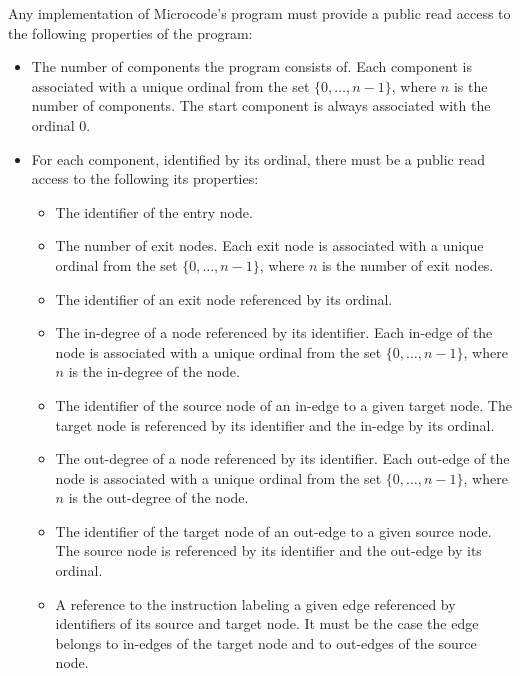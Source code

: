 \documentclass[10pt,twocolumn]{article}
\begin{document}
Any implementation of Microcode's program must provide a public read access to
the following properties of the program:
\begin{itemize}
\item The number of components the program consists of. Each component is
associated with a unique ordinal from the set $ \{ 0, \ldots, n-1 \} $, where $
n $ is the number of components. The start component is always associated with
the ordinal 0.

\item For each component, identified by its ordinal, there must be a public read
access to the following its properties:
\begin{itemize}
\item The identifier of the entry node.

\item The number of exit nodes. Each exit node is associated with a unique
ordinal from the set $ \{ 0, \ldots, n-1 \} $, where $ n $ is the number of exit
nodes.

\item The identifier of an exit node referenced by its ordinal.

\item The in-degree of a node referenced by its identifier. Each in-edge of the
node is associated with a unique ordinal from the set $ \{ 0, \ldots, n-1 \} $,
where $ n $ is the in-degree of the node.

\item The identifier of the source node of an in-edge to a given target node.
The target node is referenced by its identifier and the in-edge by its ordinal.

\item The out-degree of a node referenced by its identifier. Each out-edge of the
node is associated with a unique ordinal from the set $ \{ 0, \ldots, n-1 \} $,
where $ n $ is the out-degree of the node.

\item The identifier of the target node of an out-edge to a given source node.
The source node is referenced by its identifier and the out-edge by its ordinal.

\item A reference to the instruction labeling a given edge referenced by
identifiers of its source and target node. It must be the case the edge belongs
to in-edges of the target node and to out-edges of the source node.
\end{itemize}
\end{itemize}
\end{document}
